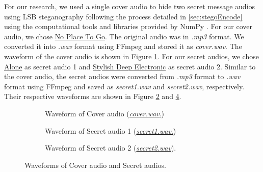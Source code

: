 \documentclass[a4paper]{cas-sc}
\begin{document}
For our research, we used a single cover audio to hide two secret message audios using LSB steganography following the process detailed in \ref{sec:stegoEncode} using the computational tools and libraries provided by NumPy \cite{harris2020array}. For our cover audio, we chose \href{https://pixabay.com/music/beats-no-place-to-go-216744/}{No Place To Go}. The original audio was in \textit{.mp3} format. We converted it into \textit{.wav} format using FFmpeg \cite{newmarch2017ffmpeg} and stored it as \textit{cover.wav}. The waveform of the cover audio is shown in Figure \ref{fig:coverAudio}. For our secret audios, we chose \href{https://pixabay.com/music/future-bass-alone-296348/}{Alone} as secret audio 1 and \href{https://pixabay.com/music/future-bass-stylish-deep-electronic-262632/}{Stylish Deep Electronic} as secret audio 2. Similar to the cover audio, the secret audios were converted from \textit{.mp3} format to \textit{.wav} format using FFmpeg and saved as \textit{secret1.wav} and \textit{secret2.wav}, respectively. Their respective waveforms are shown in Figure \ref{fig:secretAudio1} and \ref{fig:secretAudio2}.

\begin{figure}[pos=H]
    \begin{center}
        \begin{subfigure}[!h]{0.45\textwidth}
            
            \caption{Waveform of Cover audio (\href{https://drive.google.com/file/d/13kdXTKmjT0xhZVx6o9LQ5Vw33wbg7ZUV/view?usp=drive_link}{\textit{cover.wav}.})}
            \label{fig:coverAudio}
        \end{subfigure}
    \end{center}
    \begin{subfigure}[!h]{0.45\textwidth}
        \begin{center}
            \centering
            
            \caption{Waveform of Secret audio 1 (\href{https://drive.google.com/file/d/18i7FJQoh4t5WSy7vJ1vKk0Vf5ALFBXbC/view?usp=drive_link}{\textit{secret1.wav}.})}
            \label{fig:secretAudio1}
        \end{center}
    \end{subfigure}
    \hfill
    \begin{subfigure}[!h]{0.45\textwidth}
        \begin{center}
            
            \caption{Waveform of Secret audio 2 (\href{https://drive.google.com/file/d/1-nvo0a90pLwNstRUYJz0A_JeYxTTvCC0/view?usp=drive_link}{\textit{secret2.wav}}).}
            \label{fig:secretAudio2}
        \end{center}
    \end{subfigure}
    \caption{Waveforms of Cover audio and Secret audios.}
\end{figure}
\end{document}
